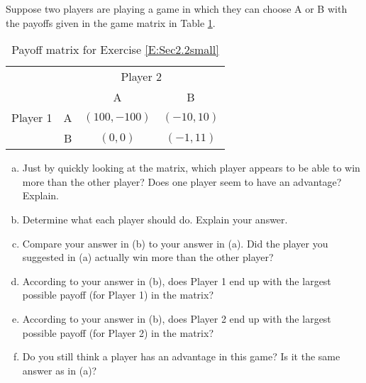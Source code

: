 \begin{xca}\label{E:Sec2.2small} Suppose two players are playing a game in which they can choose A or B with the payoffs given in the game matrix in Table \ref{T:matrixEx1Sec2.2}.


\begin{table}[h]
\centering

\begin{tabular}{cccc}
                      & \multicolumn{3}{c}{Player 2}                                                  \\ \cline{2-4} 
\multicolumn{1}{l|}{} & \multicolumn{1}{l|}{} & \multicolumn{1}{c|}{A} & \multicolumn{1}{c|}{B} \\ \cline{2-4} 
\multicolumn{1}{l|}{Player 1} & \multicolumn{1}{c|}{A} & \multicolumn{1}{c|}{$(100, -100)$} & \multicolumn{1}{c|}{$(-10, 10)$} \\ \cline{2-4} 
\multicolumn{1}{l|}{} & \multicolumn{1}{c|}{B} & \multicolumn{1}{c|}{$(0, 0)$} & \multicolumn{1}{c|}{$(-1, 11)$} \\ \cline{2-4} 
\end{tabular}
\caption{Payoff matrix for Exercise \ref{E:Sec2.2small}}
\label{T:matrixEx1Sec2.2}
\end{table}

\begin{enumerate}[(a)]
\item Just by quickly looking at the matrix, which player appears to be able to win more than the other player? Does one player seem to have an advantage? Explain.
\item Determine what each player should do. Explain your answer.
\item Compare your answer in (b) to your answer in (a). Did the player you suggested in (a) actually win more than the other player?
\item According to your answer in (b), does Player 1 end up with the largest possible payoff (for Player 1) in the matrix?
\item According to your answer in (b), does Player 2 end up with the largest possible payoff (for Player 2) in the matrix?
\item Do you still think a player has an advantage in this game? Is it the same answer as in (a)?
\end{enumerate}
\end{xca}
\vspace{.5in}

